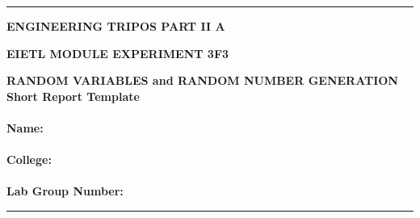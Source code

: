 \documentclass[12pt]{article}
\begin{document}
\noindent
\rule{15.7cm}{0.5mm}


\begin{center}
{\bf ENGINEERING TRIPOS PART II A}
\end{center}
\vspace{0.5cm} {\bf EIETL \hfill MODULE EXPERIMENT 3F3}
\vspace{0.5cm}
\begin{center}
{\bf RANDOM VARIABLES and RANDOM NUMBER GENERATION\\
Short  Report Template\\\hfill \\Name: \\\hfill\\
College: \\\hfill
\\
Lab Group Number:
}
\end{center}
\rule{15.7cm}{0.5mm}



\vspace*{1cm}
\begin{center}
\end{center}
\vspace*{1cm}
\end{document}
